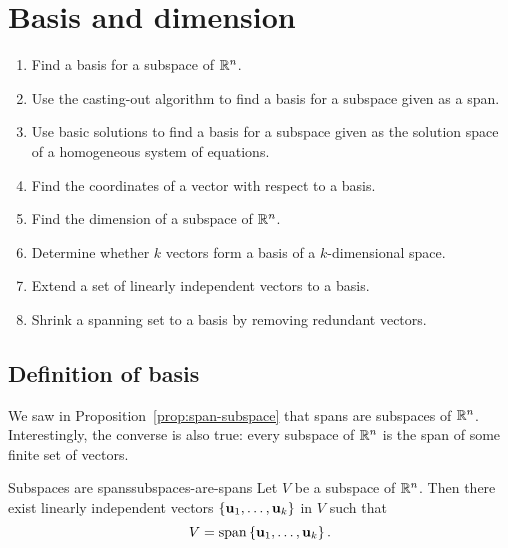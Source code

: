 \section{Basis and dimension}

\begin{outcome}
  \begin{enumerate}
  \item Find a basis for a subspace of $\mathbb{R}^n$.
  \item Use the casting-out algorithm to find a basis for a subspace
    given as a span.
  \item Use basic solutions to find a basis for a subspace given as
    the solution space of a homogeneous system of equations.
  \item Find the coordinates of a vector with respect to a basis.
  \item Find the dimension of a subspace of $\mathbb{R}^n$.
  \item Determine whether $k$ vectors form a basis of a $k$-dimensional
    space.
  \item Extend a set of linearly independent vectors to a basis.
  \item Shrink a spanning set to a basis by removing redundant vectors.
  \end{enumerate}
\end{outcome}

\subsection{Definition of basis}

We saw in Proposition~\ref{prop:span-subspace} that spans are
subspaces of\/ $\mathbb{R}^n$. Interestingly, the converse is also true: every
subspace of\/ $\mathbb{R}^n$ is the span of some finite set of vectors.

\begin{theorem}{Subspaces are spans}{subspaces-are-spans}
  Let $V$ be a subspace of\/ $\mathbb{R}^n$. Then there exist linearly
  independent vectors $\left\{\mbox{\bf u}_{1},\ldots,\mbox{\bf u}_{k}\right\}$ in $V$
  such that
  \begin{equation*}
    V= \sspan\set{\vect{u}_{1},\ldots ,\vect{u}_{k}}. 
  \end{equation*}
  \vspace{-3ex}
\end{theorem}

